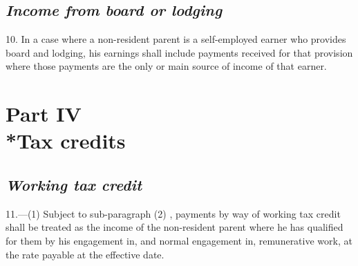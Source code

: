 \documentclass[12pt,a4paper]{article}
\begin{document}


\subsection*{\itshape Income from board or lodging}

10.  In a case where a non-resident parent is a self-employed earner who provides board and lodging, his earnings shall include payments received for that provision where those payments are the only or main source of income of that earner.

\section[Part IV --- Tax credits]{Part IV\\*Tax credits}

\renewcommand\parthead{--- Schedule Part IV}

\subsection*{\itshape 
Working tax credit  %
}

11.---(1)  Subject to 
sub-paragraph (2)%
, payments by way of 
working tax credit  %
shall be treated as the income of the non-resident parent where he has qualified for them by his engagement in, and normal engagement in, remunerative work, at the rate payable at the effective date.
\end{document}
